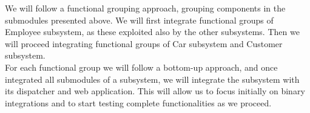 We will follow a functional grouping approach, grouping components in the submodules presented above. We will first integrate functional groups of Employee subsystem, as these exploited also by the other subsystems. Then we will proceed integrating functional groups of Car subsystem and Customer subsystem.
\\

For each functional group we will follow a bottom-up approach, and once integrated all submodules of a subsystem, we will integrate the subsystem with its dispatcher and web application. This will allow us to focus initially on binary integrations and to start testing complete functionalities as we proceed.